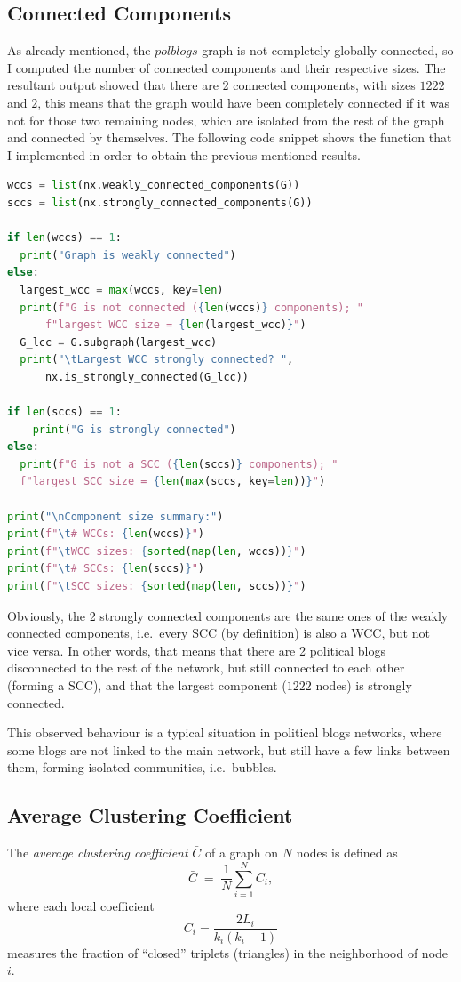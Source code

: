 \documentclass{article}
\begin{document}
\subsection{Connected Components}
\label{sec:components}
As already mentioned, the $polblogs$ graph is not completely globally connected, so I computed the number of connected components and their respective sizes. The resultant output showed that there are 2 connected components, with sizes $1222$ and $2$, this means that the graph would have been completely connected if it was not for those two remaining nodes, which are isolated from the rest of the graph and connected by themselves. 
The following code snippet shows the function that I implemented in order to obtain the previous mentioned results.
\begin{lstlisting}[language=Python, label=fig:code-CCs]
wccs = list(nx.weakly_connected_components(G))
sccs = list(nx.strongly_connected_components(G))

if len(wccs) == 1:
  print("Graph is weakly connected")
else:
  largest_wcc = max(wccs, key=len)
  print(f"G is not connected ({len(wccs)} components); "
      f"largest WCC size = {len(largest_wcc)}")
  G_lcc = G.subgraph(largest_wcc)
  print("\tLargest WCC strongly connected? ",
      nx.is_strongly_connected(G_lcc))

if len(sccs) == 1:
    print("G is strongly connected")
else:
  print(f"G is not a SCC ({len(sccs)} components); "
  f"largest SCC size = {len(max(sccs, key=len))}")

print("\nComponent size summary:")
print(f"\t# WCCs: {len(wccs)}")
print(f"\tWCC sizes: {sorted(map(len, wccs))}")
print(f"\t# SCCs: {len(sccs)}")
print(f"\tSCC sizes: {sorted(map(len, sccs))}")
\end{lstlisting}

Obviously, the 2 strongly connected components are the same ones of the weakly connected components, i.e.\ every SCC (by definition) is also a WCC, but not vice versa.
In other words, that means that there are 2 political blogs disconnected to the rest of the network, but still connected to each other (forming a SCC), and that the largest component ($1222$ nodes) is strongly connected.

This observed behaviour is a typical situation in political blogs networks, where some blogs are not linked to the main network, but still have a few links between them, forming isolated communities, i.e.\ bubbles.

\subsection{Average Clustering Coefficient}
The \emph{average clustering coefficient} $\bar C$ of a graph on $N$ nodes is defined as
\[
\bar C \;=\;\frac{1}{N}\sum_{i=1}^N C_i,
\]
where each local coefficient
\[
C_i = \frac{2L_i}{k_i(k_i-1)}
\]
measures the fraction of “closed” triplets (triangles) in the neighborhood of node~$i$.
\end{document}
